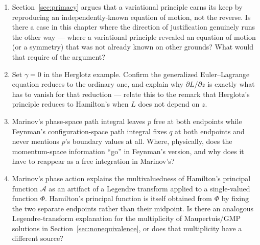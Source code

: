 \documentclass[11pt]{book}
\theoremstyle{definition}
\theoremstyle{plain}
\theoremstyle{remark}
\begin{document}
\begin{reflectionbox}
\begin{enumerate}[itemsep=2pt]
\item Section~\ref{sec:primacy} argues that a variational principle earns its keep by reproducing an independently-known equation of motion, not the reverse. Is there a case in this chapter where the direction of justification genuinely runs the other way --- where a variational principle revealed an equation of motion (or a symmetry) that was not already known on other grounds? What would that require of the argument?
\item Set $\gamma=0$ in the Herglotz example. Confirm the generalized Euler--Lagrange equation reduces to the ordinary one, and explain why $\partial L/\partial z$ is exactly what has to vanish for that reduction --- relate this to the remark that Herglotz's principle reduces to Hamilton's when $L$ does not depend on $z$.
\item Marinov's phase-space path integral leaves $p$ free at both endpoints while Feynman's configuration-space path integral fixes $q$ at both endpoints and never mentions $p$'s boundary values at all. Where, physically, does the momentum-space information ``go'' in Feynman's version, and why does it have to reappear as a free integration in Marinov's?
\item Marinov's phase action explains the multivaluedness of Hamilton's principal function $\mathcal A$ as an artifact of a Legendre transform applied to a single-valued function $\Phi$. Hamilton's principal function is itself obtained from $\Phi$ by fixing the two separate endpoints rather than their midpoint. Is there an analogous Legendre-transform explanation for the multiplicity of Maupertuis/GMP solutions in Section~\ref{sec:nonequivalence}, or does that multiplicity have a different source?
\end{enumerate}
\end{reflectionbox}
\end{document}
